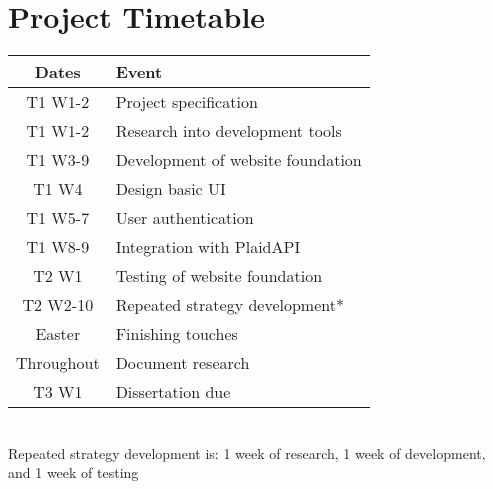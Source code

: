
\section{Project Timetable}

\begin{center}
	\begin{tabular}{ | c | l | }
		\hline
		\textbf{Dates} & \textbf{Event} \\ \hline
		T1 W1-2 & Project specification \\ \hline
		T1 W1-2 & Research into development tools \\ \hline
		T1 W3-9 & Development of website foundation \\ \hline
		T1 W4 & Design basic UI \\ \hline
		T1 W5-7 & User authentication \\ \hline
		T1 W8-9 & Integration with PlaidAPI \\ \hline
		T2 W1 & Testing of website foundation \\ \hline
		T2 W2-10 & Repeated strategy development* \\ \hline
		Easter & Finishing touches \\ \hline
		Throughout & Document research \\ \hline
		T3 W1 & Dissertation due \\ \hline
	\end{tabular}
	\\
	\vspace{0.3cm}
	\scriptsize *Repeated strategy development is: 1 week of research, 1 week of development, and 1 week of testing
\end{center}